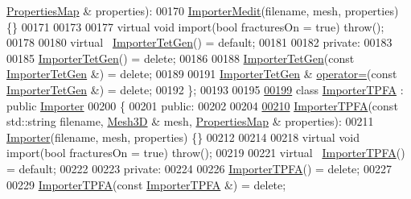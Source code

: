 \begin{DoxyCode}
      \hyperlink{classFVCode3D_1_1PropertiesMap}{PropertiesMap} & properties):
00170         \hyperlink{classFVCode3D_1_1ImporterMedit}{ImporterMedit}(filename, mesh, properties) \{\}
00171 
00173 
00177     \textcolor{keyword}{virtual} \textcolor{keywordtype}{void} \textcolor{keyword}{import}(\textcolor{keywordtype}{bool} fracturesOn = \textcolor{keyword}{true}) \textcolor{keywordflow}{throw}();
00178 
00180     \textcolor{keyword}{virtual} ~\hyperlink{classFVCode3D_1_1ImporterTetGen}{ImporterTetGen}() = \textcolor{keywordflow}{default};
00181 
00182 \textcolor{keyword}{private}:
00183 
00185     \hyperlink{classFVCode3D_1_1ImporterTetGen}{ImporterTetGen}() = \textcolor{keyword}{delete};
00186 
00188     \hyperlink{classFVCode3D_1_1ImporterTetGen}{ImporterTetGen}(\textcolor{keyword}{const} \hyperlink{classFVCode3D_1_1ImporterTetGen}{ImporterTetGen} &) = \textcolor{keyword}{delete};
00189 
00191     \hyperlink{classFVCode3D_1_1ImporterTetGen}{ImporterTetGen} & \hyperlink{classFVCode3D_1_1Importer_a2559d25ef11c7a21e97bb4d17b51aaaf}{operator=}(\textcolor{keyword}{const} \hyperlink{classFVCode3D_1_1ImporterTetGen}{ImporterTetGen} &) = \textcolor{keyword}{delete};
00192 \};
00193 
00195 
\hypertarget{Import_8hpp_source.tex_l00199}{}\hyperlink{classFVCode3D_1_1ImporterTPFA}{00199} \textcolor{keyword}{class }\hyperlink{classFVCode3D_1_1ImporterTPFA}{ImporterTPFA} : \textcolor{keyword}{public} \hyperlink{classFVCode3D_1_1Importer}{Importer}
00200 \{
00201 \textcolor{keyword}{public}:
00202 
00204 
\hypertarget{Import_8hpp_source.tex_l00210}{}\hyperlink{classFVCode3D_1_1ImporterTPFA_a7823b5af6a6a691ad0fb17dde3b1fe8d}{00210}     \hyperlink{classFVCode3D_1_1ImporterTPFA_a7823b5af6a6a691ad0fb17dde3b1fe8d}{ImporterTPFA}(\textcolor{keyword}{const} std::string filename, \hyperlink{classFVCode3D_1_1Mesh3D}{Mesh3D} & mesh, 
      \hyperlink{classFVCode3D_1_1PropertiesMap}{PropertiesMap} & properties):
00211         \hyperlink{classFVCode3D_1_1Importer}{Importer}(filename, mesh, properties) \{\}
00212 
00214 
00218     \textcolor{keyword}{virtual} \textcolor{keywordtype}{void} \textcolor{keyword}{import}(\textcolor{keywordtype}{bool} fracturesOn = \textcolor{keyword}{true}) \textcolor{keywordflow}{throw}();
00219 
00221     \textcolor{keyword}{virtual} ~\hyperlink{classFVCode3D_1_1ImporterTPFA}{ImporterTPFA}() = \textcolor{keywordflow}{default};
00222 
00223 \textcolor{keyword}{private}:
00224 
00226     \hyperlink{classFVCode3D_1_1ImporterTPFA}{ImporterTPFA}() = \textcolor{keyword}{delete};
00227 
00229     \hyperlink{classFVCode3D_1_1ImporterTPFA}{ImporterTPFA}(\textcolor{keyword}{const} \hyperlink{classFVCode3D_1_1ImporterTPFA}{ImporterTPFA} &) = \textcolor{keyword}{delete};

\end{DoxyCode}
